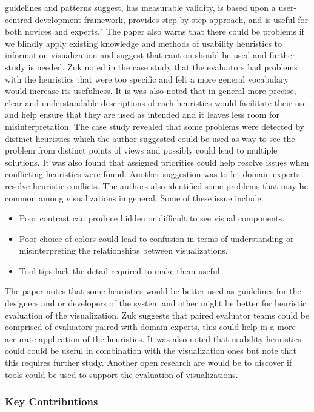 \documentclass{sig-alternate}
\begin{document}
guidelines and patterns suggest, has measurable validity, is based upon a
user-centred development framework, provides step-by-step approach, and is
useful for both novices and experts." The paper also warns that there could be
problems if we blindly apply existing knowledge and methods of usability
heuristics to information visualization and suggest that caution should be used
and further study is needed. Zuk noted in the case study that the evaluators had
problems with the heuristics that were too specific and felt a more general
vocabulary would increase its usefulness. It is was also noted that in general
more precise, clear and understandable descriptions of each heuristics would
facilitate their use and help ensure that they are used as intended and it
leaves less room for misinterpretation. The case study revealed that some
problems were detected by distinct heuristics which the author suggested could
be used as way to see the problem from distinct points of views and possibly
could lead to multiple solutions.  It was also found that assigned priorities
could help resolve issues when conflicting heuristics were found. Another
suggestion was to let domain experts resolve heuristic conflicts. The authors
also identified some problems that may be common among visualizations in
general. Some of these issue include: \begin{itemize} \item Poor contrast can
produce hidden or difficult to see visual components. \item Poor choice of
colors could lead to confusion in terms of understanding or misinterpreting the
relationships between visualizations. \item Tool tips lack the detail required
to make them useful.
\end{itemize}
The paper notes that some heuristics would be better used as guidelines for the
designers and or developers of the system and other might be better for
heuristic evaluation of the visualization. Zuk suggests that paired evaluator
teams could be comprised of evaluators paired with domain experts, this could
help in a more accurate application of the heuristics. It was also noted that
usability heuristics could could be useful in combination with the visualization
ones but note that this requires further study. Another open research are would
be to discover if tools could be used to support the evaluation of
visualizations.
\subsubsection{Key Contributions}
\end{document}
